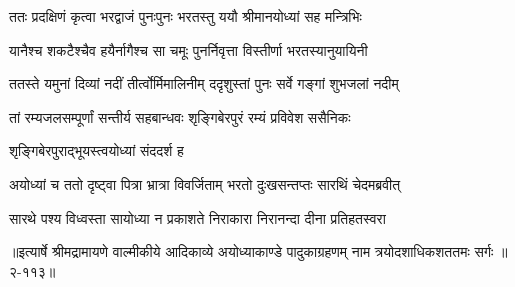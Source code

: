 \twolineshloka
{ततः प्रदक्षिणं कृत्वा भरद्वाजं पुनःपुनः}
{भरतस्तु ययौ श्रीमानयोध्यां सह मन्त्रिभिः} %

\twolineshloka
{यानैश्च शकटैश्चैव हयैर्नागैश्च सा चमूः}
{पुनर्निवृत्ता विस्तीर्णा भरतस्यानुयायिनी} %

\twolineshloka
{ततस्ते यमुनां दिव्यां नदीं तीर्त्वोर्मिमालिनीम्}
{ददृशुस्तां पुनः सर्वे गङ्गां शुभजलां नदीम्} %

\twolineshloka
{तां रम्यजलसम्पूर्णां सन्तीर्य सहबान्धवः}
{शृङ्गिबेरपुरं रम्यं प्रविवेश ससैनिकः} %

\onelineshloka
{शृङ्गिबेरपुराद्भूयस्त्वयोध्यां संददर्श ह} %

\twolineshloka
{अयोध्यां च ततो दृष्ट्वा पित्रा भ्रात्रा विवर्जिताम्}
{भरतो दुःखसन्तप्तः सारथिं चेदमब्रवीत्} %

\twolineshloka
{सारथे पश्य विध्वस्ता सायोध्या न प्रकाशते}
{निराकारा निरानन्दा दीना प्रतिहतस्वरा} %


॥इत्यार्षे श्रीमद्रामायणे वाल्मीकीये आदिकाव्ये अयोध्याकाण्डे पादुकाग्रहणम् नाम त्रयोदशाधिकशततमः सर्गः ॥२-११३॥
